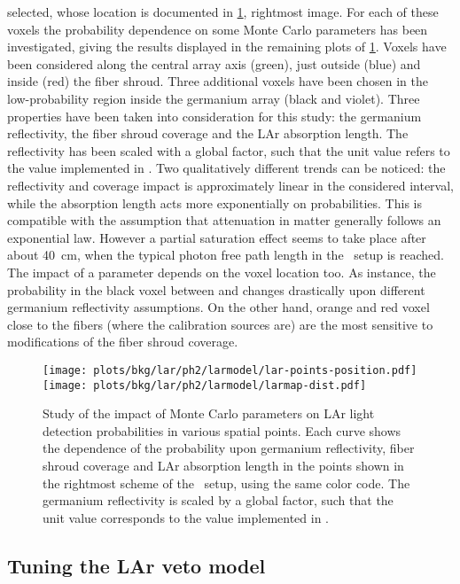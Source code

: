 selected, whose location is documented in \cref{fig:bkg:lar:ph2:larmap:dist}, rightmost
image. For each of these voxels the probability dependence on some Monte Carlo parameters
has been investigated, giving the results displayed in the remaining plots of
\cref{fig:bkg:lar:ph2:larmap:dist}. Voxels have been considered along the central array
axis (green), just outside (blue) and inside (red) the fiber shroud. Three additional
voxels have been chosen in the low-probability region inside the germanium array (black
and violet). Three properties have been taken into consideration for this study: the
germanium reflectivity, the fiber shroud coverage and the LAr absorption length. The
reflectivity has been scaled with a global factor, such that the unit value refers to the
value implemented in \mage. Two qualitatively different trends can be noticed: the
reflectivity and coverage impact is approximately linear in the considered interval, while
the absorption length acts more exponentially on probabilities. This is compatible with
the assumption that attenuation in matter generally follows an exponential law. However a
partial saturation effect seems to take place after about 40~cm, when the typical photon
free path length in the \gerda\ setup is reached. The impact of a parameter depends on the
voxel location too. As instance, the probability in the black voxel between  and
 changes drastically upon different germanium reflectivity assumptions. On the
other hand, orange and red voxel close to the fibers (where the calibration sources are)
are the most sensitive to modifications of the fiber shroud coverage.

\begin{figure}
  \centering
  \texttt{[image: plots/bkg/lar/ph2/larmodel/lar-points-position.pdf]}
  \texttt{[image: plots/bkg/lar/ph2/larmodel/larmap-dist.pdf]}
  \caption{%
    Study of the impact of Monte Carlo parameters on LAr light detection probabilities in
    various spatial points. Each curve shows the dependence of the probability upon
    germanium reflectivity, fiber shroud coverage and LAr absorption length in the points
    shown in the rightmost scheme of the \gerda\ setup, using the same color code. The
    germanium reflectivity is scaled by a global factor, such that the unit value
    corresponds to the value implemented in \mage. 
  }\label{fig:bkg:lar:ph2:larmap:dist}
\end{figure}

\subsection{Tuning the LAr veto model}%
\label{sec:bkg:lar:ph2:pcalib}

